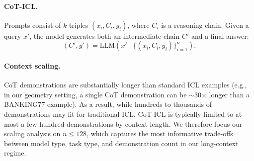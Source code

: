 \paragraph{CoT-ICL.}
Prompts consist of $k$ triples $(x_i, C_i, y_i)$, where $C_i$ is a reasoning chain.
Given a query $x'$, the model generates both an intermediate chain $C'$ and a final answer:
\begin{equation}
(C', y') = \mathrm{LLM}\!\left(x' \mid \{(x_i, C_i, y_i)\}_{i=1}^n\right).
\end{equation}

\paragraph{Context scaling.}
CoT demonstrations are substantially longer than standard ICL examples (e.g., in our geometry setting, a single CoT demonstration can be $\sim$30$\times$ longer than a BANKING77 example).
As a result, while hundreds to thousands of demonstrations may fit for traditional ICL, CoT-ICL is typically limited to at most a few hundred demonstrations by context length.
We therefore focus our scaling analysis on $n \le 128$, which captures the most informative trade-offs between model type, task type, and demonstration count in our long-context regime.









